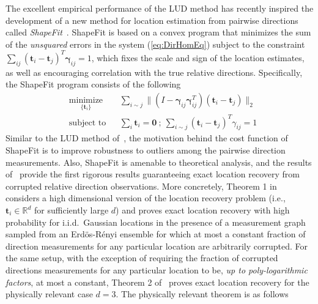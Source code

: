 \documentclass[10pt]{article}
\newcommand{\R}{\ensuremath{\mathbb{R}}}
\begin{document}
The excellent empirical performance of the LUD method has recently inspired the development of a new method for location estimation from pairwise directions called \textit{ShapeFit}~\cite{ShapeFit}. ShapeFit is based on a convex program that minimizes the sum of the \textit{unsquared} errors in the system (\ref{eq:DirHomEq}) subject to the constraint $\sum_{ij}(\mathbf{t}_i-\mathbf{t}_j)^T\mathbf{\gamma}_{ij} = 1$, which fixes the scale and sign of the location estimates, as well as encouraging correlation with the true relative directions. Specifically, the ShapeFit program consists of the following
\begin{equation}
\label{eq:ShapeFit}
\begin{aligned}
&\underset{{\scriptstyle \{\mathbf{t}_i\} }}{\text{minimize}}
& & \sum_{i\sim j}  \| (I-\mathbf{\gamma}_{ij}\mathbf{\gamma}_{ij}^T)(\mathbf{t}_i - \mathbf{t}_j) \|_2 \\
& \text{subject to}
& & \sum_{i} \mathbf{t}_i = \mathbf{0} \ ; \ \sum_{i\sim j}  (\mathbf{t}_i - \mathbf{t}_j)^T\gamma_{ij} = 1
\end{aligned}
\end{equation}
Similar to the LUD method of~\cite{LUD}, the motivation behind the cost function of ShapeFit is to improve robustness to outliers among the pairwise direction measurements. Also, ShapeFit is amenable to theoretical analysis, and the results of~\cite{ShapeFit} provide the first rigorous results guaranteeing exact location recovery from corrupted relative direction observations. More concretely, Theorem 1 in~\cite{ShapeFit} considers a high dimensional version of the location recovery problem (i.e., $\mathbf{t}_i\in\R^d$ for sufficiently large $d$) and proves exact location recovery with high probability for i.i.d.~Gaussian locations in the presence of a measurement graph sampled from an Erd\"{o}s-R\'{e}nyi ensemble for which at most a constant fraction of direction measurements for any particular location are arbitrarily corrupted. For the same setup, with the exception of requiring the fraction of corrupted directions measurements for any particular location to be, \emph{up to poly-logarithmic factors}, at most a constant, Theorem 2 of~\cite{ShapeFit} proves exact location recovery for the physically relevant case $d=3$. The physically relevant theorem is as follows
\end{document}
